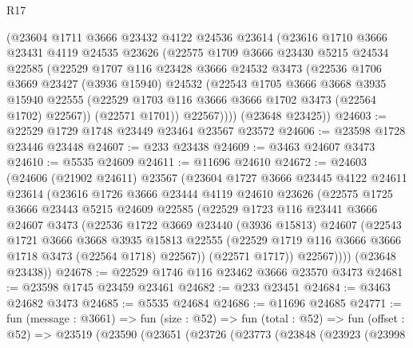 \begin{lexlean}{R17}
\begin{coremodule}
      (@23604
        @1711
        @3666
        @23432
        @4122
        @24536
        @23614
        (@23616
          @1710
          @3666
          @23431
          @4119
          @24535
          @23626
          (@22575
            @1709
            @3666
            @23430
            @5215
            @24534
            @22585
            (@22529
              @1707
              @116
              @23428
              @3666
              @24532
              @3473
              (@22536
                @1706
                @3669
                @23427
                (@3936 @15940)
                @24532
                (@22543
                  @1705
                  @3666
                  @3668
                  @3935
                  @15940
                  @22555
                  (@22529 @1703 @116 @3666 @3666 @1702 @3473 (@22564 @1702) @22567))
                (@22571 @1701))
              @22567))))
      (@23648 @23425))
@24603 := @22529 @1729 @1748 @23449 @23464 @23567 @23572
@24606 := @23598 @1728 @23446 @23448
@24607 := @233 @23438
@24609 := @3463 @24607 @3473
@24610 := @5535 @24609
@24611 := @11696 @24610
@24672 := @24603
    (@24606
      (@21902 @24611)
      @23567
      (@23604
        @1727
        @3666
        @23445
        @4122
        @24611
        @23614
        (@23616
          @1726
          @3666
          @23444
          @4119
          @24610
          @23626
          (@22575
            @1725
            @3666
            @23443
            @5215
            @24609
            @22585
            (@22529
              @1723
              @116
              @23441
              @3666
              @24607
              @3473
              (@22536
                @1722
                @3669
                @23440
                (@3936 @15813)
                @24607
                (@22543
                  @1721
                  @3666
                  @3668
                  @3935
                  @15813
                  @22555
                  (@22529 @1719 @116 @3666 @3666 @1718 @3473 (@22564 @1718) @22567))
                (@22571 @1717))
              @22567))))
      (@23648 @23438))
@24678 := @22529 @1746 @116 @23462 @3666 @23570 @3473
@24681 := @23598 @1745 @23459 @23461
@24682 := @233 @23451
@24684 := @3463 @24682 @3473
@24685 := @5535 @24684
@24686 := @11696 @24685
@24771 := fun (message : @3661) =>
  fun (size : @52) =>
  fun (total : @52) =>
  fun (offset : @52) =>
  @23519
    (@23590
      (@23651
        (@23726
          (@23773
            (@23848
              (@23923
                (@23998

\end{coremodule}
\end{lexlean}
